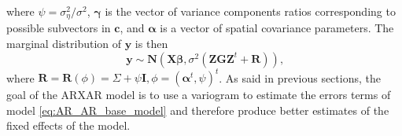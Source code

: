 where $\psi = \sigma^2_{\eta}/\sigma^2$, $\boldsymbol{\gamma}$ is the vector of variance components ratios corresponding to possible subvectors in $\mathbf{c}$, and $\boldsymbol{\alpha}$ is a vector of spatial covariance parameters. The marginal distribution of $\mathbf{y}$ is then 
\begin{equation}
    \mathbf{y} \sim \mathbf{N}\left(\mathbf{X} \boldsymbol{\beta}, \sigma^{2}\left(\mathbf{Z} \mathbf{G} \mathbf{Z}^{t}+\mathbf{R}\right)\right)
    \text{,}
    \label{eq:y_distribtuion_AR}
\end{equation}
where $\mathbf{R}=\mathbf{R}(\phi)=\Sigma+\psi \mathbf{I}, \phi=\left(\boldsymbol{\alpha}^{t}, \psi\right)^{t}$.
As said in previous sections, the goal of the ARXAR model is to use a variogram to estimate the errors terms of model \ref{eq:AR_AR_base_model} and therefore produce better estimates of the fixed effects of the model.\\

